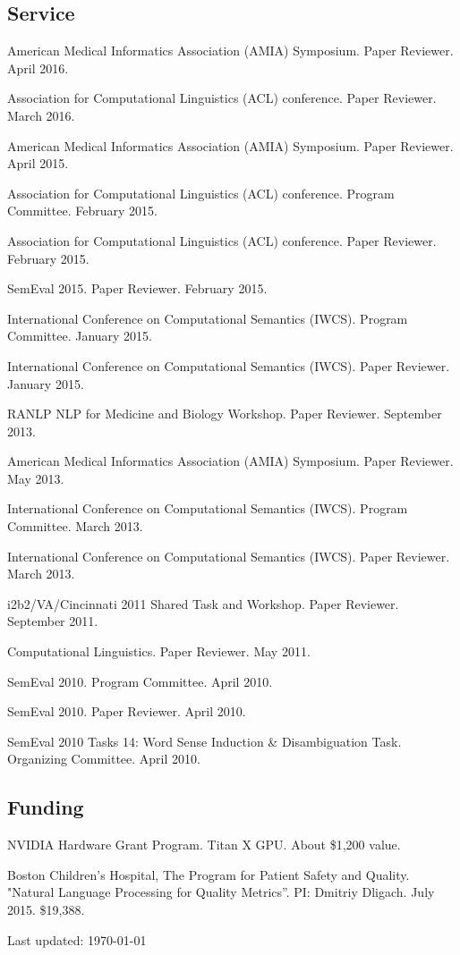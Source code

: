\documentclass[letterpaper]{article}
\renewenvironment{itemize}{
  \begin{list}{}{
    \setlength{\leftmargin}{1.5em}
  }
}{
  \end{list}
}
\begin{document}
\subsection*{Service}

\begin{itemize}
\item American Medical Informatics Association (AMIA) Symposium. Paper Reviewer. April 2016.
\item Association for Computational Linguistics (ACL) conference. Paper Reviewer. March 2016.
\item American Medical Informatics Association (AMIA) Symposium. Paper Reviewer. April 2015.
\item Association for Computational Linguistics (ACL) conference. Program Committee. February 2015.
\item Association for Computational Linguistics (ACL) conference. Paper Reviewer. February 2015.
\item SemEval 2015. Paper Reviewer. February 2015.
\item International Conference on Computational Semantics (IWCS). Program Committee. January 2015.
\item International Conference on Computational Semantics (IWCS). Paper Reviewer. January 2015.
\item RANLP NLP for Medicine and Biology Workshop. Paper Reviewer. September 2013.
\item American Medical Informatics Association (AMIA) Symposium. Paper Reviewer. May 2013.
\item International Conference on Computational Semantics (IWCS). Program Committee. March 2013.
\item International Conference on Computational Semantics (IWCS). Paper Reviewer. March 2013.
\item i2b2/VA/Cincinnati 2011 Shared Task and Workshop. Paper Reviewer. September 2011.
\item Computational Linguistics. Paper Reviewer. May 2011.
\item SemEval 2010. Program Committee. April 2010.
\item SemEval 2010. Paper Reviewer. April 2010.
\item SemEval 2010 Tasks 14: Word Sense Induction \& Disambiguation Task. Organizing Committee. April 2010.
\end{itemize}

\subsection*{Funding}
\begin{itemize}
\item NVIDIA Hardware Grant Program. Titan X GPU. About \$1,200 value.
\item Boston Children's Hospital, The Program for Patient Safety and Quality. "Natural Language Processing for Quality Metrics''. PI: Dmitriy Dligach. July 2015. \$19,388.
\end{itemize}


\bigskip

\begin{center}
\begin{footnotesize}
Last updated: \today \\
\end{footnotesize}
\end{center}
\end{document}
